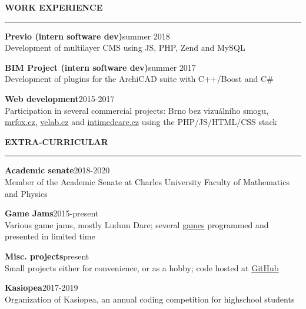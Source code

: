 \documentclass[11pt,a4paper]{article} %
\newcommand{\hSection}[1]{
    \medskip
    \MakeUppercase{\bf #1}
    \medskip
    \hrule
}
\newcommand{\hSubsection}[2]{{\bf #1}\hfill {#2}}
\begin{document}
\vspace{-0.5cm}
\hSection{Work Experience}
\hSubsection{Previo (intern software dev)}{summer 2018} \\
Development of multilayer CMS using JS, PHP, Zend and MySQL

\hSubsection{BIM Project (intern software dev)}{summer 2017} \\
Development of plugins for the ArchiCAD suite with C++/Boost and C\#

\hSubsection{Web development}{2015-2017} \\
Participation in several commercial projects: Brno bez vizuálního smogu, \href{https://www.mrfox.cz/}{mrfox.cz}, \href{http://www.velab.cz/}{velab.cz} and \href{http://www.intimedcare.cz/}{intimedcare.cz} using the PHP/JS/HTML/CSS stack

\hSection{Extra-Curricular}
\hSubsection{Academic senate}{2018-2020} \\
Member of the Academic Senate at Charles University Faculty of Mathematics and Physics

\hSubsection{Game Jams}{2015-present} \\
Various game jams, mostly Ludum Dare; several \href{https://github.com/allemansratten}{games} programmed and presented in limited time

\hSubsection{Misc. projects}{present} \\
Small projects either for convenience, or as a hobby; code hosted at \href{https://github.com/zouharvi}{GitHub}

\hSubsection{Kasiopea}{2017-2019} \\
Organization of Kasiopea, an annual coding competition for highschool students
\end{document}
